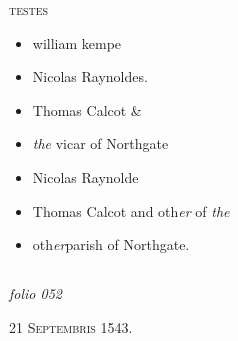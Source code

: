 \documentclass[12pt, a4paper]{book}
\begin{document}
				\begin{center}  {\scshape testes}  \end{center}
			
               		\begin{itemize}
               			\item[]william kempe 
               			\item[]Nicolas Raynoldes.
               			\item[]Thomas Calcot \& 
               		\end{itemize}
               		\begin{itemize}
               			\item[]\textit{the} vicar of Northgate
               			\item[]Nicolas Raynolde
               			\item[]Thomas Calcot and oth\textit{er} of \textit{the}
               			\item[]oth\textit{er}parish of Northgate.
               		\end{itemize}
               	


            
            
\dotfill
					  \subsection*{}  \subsection*{}  \subsection*{}

\textit{folio 052}


            
               
				\begin{center} \begin{large} {\scshape 
                  21 Septembris 1543.} \end{large} \end{center}
			
               
               	
\end{document}
